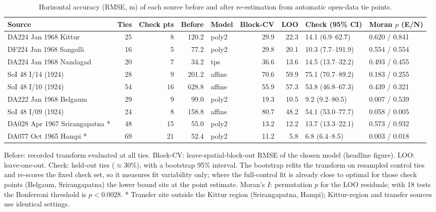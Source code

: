 \begin{table}[!htbp]
\centering
\footnotesize
\setlength{\tabcolsep}{4pt}
\caption{Horizontal accuracy (RMSE, m) of each source before and after re-estimation from automatic open-data tie points.}
\label{tab:accuracy}
\begin{adjustbox}{max width=\linewidth}
\begin{tabular}{lrrrlrrll}
\toprule
Source & Ties & Check pts & Before & Model & Block-CV & LOO & Check (95\% CI) & Moran $p$ (E/N) \\
\midrule
DA224 Jan 1968 Kittur & 25 & 8 & 120.2 & poly2 & 29.9 & 22.3 & 14.1 (6.9--62.7) & 0.620 / 0.841 \\
DF224 Jan 1968 Sangolli & 16 & 5 & 77.2 & poly2 & 29.8 & 20.1 & 10.3 (7.7--191.9) & 0.554 / 0.554 \\
DA224 Jan 1968 Nandagad & 20 & 7 & 34.2 & tps & 36.6 & 13.6 & 14.5 (13.7--32.2) & 0.493 / 0.455 \\
SoI 48 I/14 (1924) & 28 & 9 & 201.2 & affine & 70.6 & 59.9 & 75.1 (70.7--89.2) & 0.183 / 0.255 \\
SoI 48 I/10 (1924) & 54 & 16 & 628.8 & affine & 55.9 & 57.3 & 53.8 (46.8--67.3) & 0.439 / 0.321 \\
DA222 Jan 1968 Belgaum & 29 & 9 & 99.0 & poly2 & 19.3 & 10.5 & 9.2 (9.2--80.5) & 0.007 / 0.539 \\
SoI 48 I/09 (1924) & 24 & 8 & 158.8 & affine & 80.7 & 48.2 & 54.1 (53.0--77.7) & 0.058 / 0.005 \\
DA028 Apr 1967 Srirangapatna * & 48 & 15 & 55.0 & poly2 & 13.2 & 12.2 & 13.7 (13.3--22.1) & 0.573 / 0.932 \\
DA077 Oct 1965 Hampi * & 69 & 21 & 52.4 & poly2 & 11.2 & 5.8 & 6.8 (6.4--8.5) & 0.003 / 0.018 \\
\bottomrule
\end{tabular}
\end{adjustbox}
\par\smallskip\parbox{\linewidth}{\scriptsize Before: recorded transform evaluated at all ties. Block-CV: leave-spatial-block-out RMSE of the chosen model (headline figure). LOO: leave-one-out. Check: held-out ties ($\approx$30\%), with a bootstrap 95\% interval. The bootstrap refits the transform on resampled control ties and re-scores the fixed check set, so it measures fit variability only; where the full-control fit is already close to optimal for those check points (Belgaum, Srirangapatna) the lower bound sits at the point estimate. Moran's $I$: permutation $p$ for the LOO residuals; with 18 tests the Bonferroni threshold is $p<0.0028$. * Transfer site outside the Kittur region (Srirangapatna, Hampi); Kittur-region and transfer sources use identical settings.}
\end{table}
